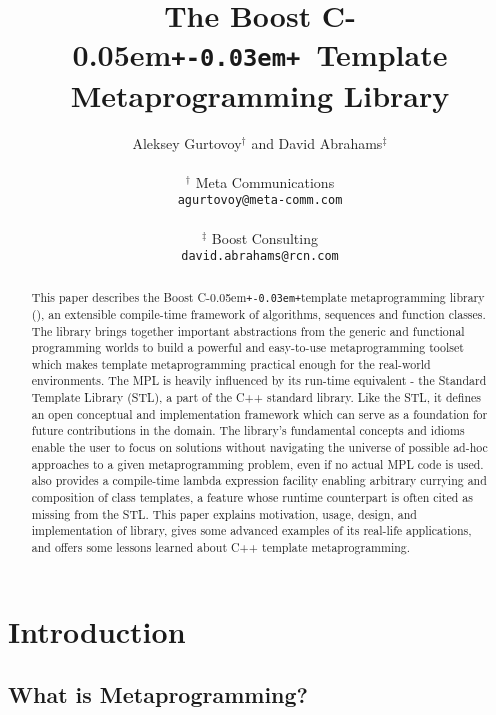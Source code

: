 \documentclass{netobjectdays}
\newcommand{\Cpp}{C\kern-0.05em\texttt{+\kern-0.03em+}}
\newcommand{\mpl}{\code{boost::mpl}}
\begin{document}
\title{The Boost \Cpp\ Template Metaprogramming Library}

\author{Aleksey Gurtovoy$^\dag$ and David Abrahams$^\ddag$ \\
\\
$^\dag$ Meta Communications \\
\texttt{agurtovoy@meta-comm.com}\\
\\
$^\ddag$ Boost Consulting \\
\texttt{david.abrahams@rcn.com}
}

\maketitle

\begin{abstract} $\!$This paper describes the Boost \Cpp template
metaprogramming library (\mpl), an extensible compile-time framework
of algorithms, sequences and function classes. The library brings
together important abstractions from the generic and functional
programming worlds to build a powerful and easy-to-use
metaprogramming toolset which makes template metaprogramming practical
enough for the real-world environments. The MPL is heavily influenced
by its run-time equivalent - the Standard Template Library (STL), a
part of the C++ standard library. Like the STL, it defines an open
conceptual and implementation framework which can serve as a
foundation for future contributions in the domain. The library's
fundamental concepts and idioms enable the user to focus on solutions 
without navigating the universe of possible ad-hoc approaches to a 
given metaprogramming problem, even if no actual MPL code is used. 
{\mpl} also provides a compile-time lambda expression facility enabling
arbitrary currying and composition of class templates, a feature whose
runtime counterpart is often cited as missing from the STL. This paper
explains motivation, usage, design, and implementation of \mpl 
library, gives some advanced examples of its real-life applications, 
and offers some lessons learned about C++ template metaprogramming.
\end{abstract}


\section{Introduction}

\subsection{What is Metaprogramming?}
\end{document}
